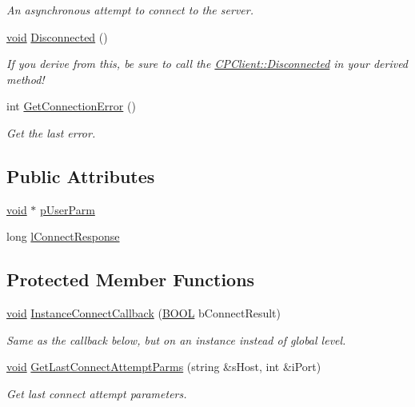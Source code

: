 \begin{DoxyCompactItemize}
\begin{DoxyCompactList}\small\item\em \-An asynchronous attempt to connect to the server. \end{DoxyCompactList}\item 
\hyperlink{_cpclient_8h_a6464f7480a0fd0ee170cba12b2c0497f}{void} \hyperlink{class_c_p_client_aea1f62c59dfd45e814e9734ece8b0ab8}{\-Disconnected} ()
\begin{DoxyCompactList}\small\item\em \-If you derive from this, be sure to call the \hyperlink{class_c_p_client_aea1f62c59dfd45e814e9734ece8b0ab8}{\-C\-P\-Client\-::\-Disconnected} in your derived method! \end{DoxyCompactList}\item 
int \hyperlink{class_c_p_client_ade37dcde8e52312539263265295b9740}{\-Get\-Connection\-Error} ()
\begin{DoxyCompactList}\small\item\em \-Get the last error. \end{DoxyCompactList}\end{DoxyCompactItemize}
\subsection*{\-Public \-Attributes}
\begin{DoxyCompactItemize}
\item 
\hyperlink{_cpclient_8h_a6464f7480a0fd0ee170cba12b2c0497f}{void} $\ast$ \hyperlink{class_c_p_client_a4c7f8139f898544073f5e535d5022ae6}{p\-User\-Parm}
\item 
long \hyperlink{class_c_p_client_aa5d2b8ddd7b8ba324be40578ed419c52}{l\-Connect\-Response}
\end{DoxyCompactItemize}
\subsection*{\-Protected \-Member \-Functions}
\begin{DoxyCompactItemize}
\item 
\hyperlink{_cpclient_8h_a6464f7480a0fd0ee170cba12b2c0497f}{void} \hyperlink{class_c_p_client_a164a717aa6aac79d279d76624366ebcb}{\-Instance\-Connect\-Callback} (\hyperlink{_cpclient_8h_a3be13892ae7076009afcf121347dd319}{\-B\-O\-O\-L} b\-Connect\-Result)
\begin{DoxyCompactList}\small\item\em \-Same as the callback below, but on an instance instead of global level. \end{DoxyCompactList}\item 
\hyperlink{_cpclient_8h_a6464f7480a0fd0ee170cba12b2c0497f}{void} \hyperlink{class_c_p_client_a455c754945a3637cf1efcaaae38f6ebc}{\-Get\-Last\-Connect\-Attempt\-Parms} (string \&s\-Host, int \&i\-Port)
\begin{DoxyCompactList}\small\item\em \-Get last connect attempt parameters. \end{DoxyCompactList}\end{DoxyCompactItemize}
